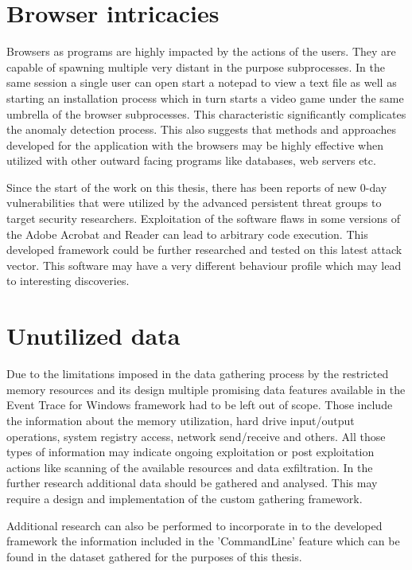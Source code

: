 \documentclass[a4paper,twoside,12pt]{book}
\begin{document}
\section{Browser intricacies}

Browsers as programs are highly impacted by the actions of the users. They are capable of spawning
multiple very distant in the purpose subprocesses. In the same session a single user can open start
a notepad to view a text file as well as starting an installation process which in turn starts a 
video game under the same umbrella of the browser subprocesses. This characteristic significantly
complicates the anomaly detection process. This also suggests that methods and approaches developed
for the application with the browsers may be highly effective when utilized with other outward 
facing programs like databases, web servers etc.

Since the start of the work on this thesis, there has been reports of new 0-day vulnerabilities that were
utilized by the advanced persistent threat groups to target security researchers. Exploitation of the
software flaws in some versions of the Adobe Acrobat and Reader can lead to arbitrary code execution\cite{bib:AdobeExploit}.
This developed framework could be further researched and tested on this latest attack vector. This 
software may have a very different behaviour profile which may lead to interesting discoveries.

\section{Unutilized data}

Due to the limitations imposed in the data gathering process by the restricted memory resources and its
design multiple promising data features available in the Event Trace for Windows framework had to be
left out of scope. Those include the information about the memory utilization, hard drive input/output 
operations, system registry access, network send/receive and others. All those types of information
may indicate ongoing exploitation or post exploitation actions like scanning of the available resources
and data exfiltration. In the further research additional 
data should be gathered and analysed. This may require a design and implementation of the custom  
gathering framework.

Additional research can also be performed to incorporate in to the developed framework the 
information included in the 'CommandLine' feature which can be found in the dataset gathered for the purposes
of this thesis.
\end{document}
